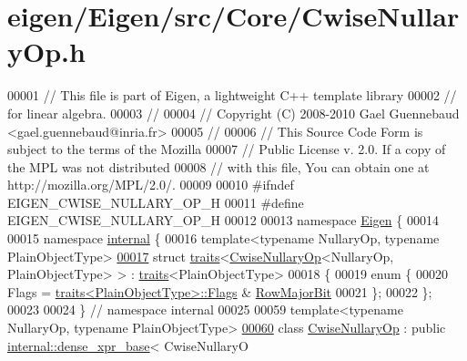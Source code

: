 \hypertarget{eigen_2_eigen_2src_2_core_2_cwise_nullary_op_8h_source}{}\section{eigen/\+Eigen/src/\+Core/\+Cwise\+Nullary\+Op.h}
\label{eigen_2_eigen_2src_2_core_2_cwise_nullary_op_8h_source}

\begin{DoxyCode}
00001 \textcolor{comment}{// This file is part of Eigen, a lightweight C++ template library}
00002 \textcolor{comment}{// for linear algebra.}
00003 \textcolor{comment}{//}
00004 \textcolor{comment}{// Copyright (C) 2008-2010 Gael Guennebaud <gael.guennebaud@inria.fr>}
00005 \textcolor{comment}{//}
00006 \textcolor{comment}{// This Source Code Form is subject to the terms of the Mozilla}
00007 \textcolor{comment}{// Public License v. 2.0. If a copy of the MPL was not distributed}
00008 \textcolor{comment}{// with this file, You can obtain one at http://mozilla.org/MPL/2.0/.}
00009 
00010 \textcolor{preprocessor}{#ifndef EIGEN\_CWISE\_NULLARY\_OP\_H}
00011 \textcolor{preprocessor}{#define EIGEN\_CWISE\_NULLARY\_OP\_H}
00012 
00013 \textcolor{keyword}{namespace }\hyperlink{namespace_eigen}{Eigen} \{
00014 
00015 \textcolor{keyword}{namespace }\hyperlink{namespaceinternal}{internal} \{
00016 \textcolor{keyword}{template}<\textcolor{keyword}{typename} NullaryOp, \textcolor{keyword}{typename} PlainObjectType>
\hyperlink{struct_eigen_1_1internal_1_1traits_3_01_cwise_nullary_op_3_01_nullary_op_00_01_plain_object_type_01_4_01_4}{00017} \textcolor{keyword}{struct }\hyperlink{struct_eigen_1_1internal_1_1traits}{traits}<\hyperlink{group___core___module_class_eigen_1_1_cwise_nullary_op}{CwiseNullaryOp}<NullaryOp, PlainObjectType> > : 
      \hyperlink{struct_eigen_1_1internal_1_1traits}{traits}<PlainObjectType>
00018 \{
00019   \textcolor{keyword}{enum} \{
00020     Flags = \hyperlink{struct_eigen_1_1internal_1_1traits}{traits<PlainObjectType>::Flags} & 
      \hyperlink{group__flags_gae4f56c2a60bbe4bd2e44c5b19cbe8762}{RowMajorBit}
00021   \};
00022 \};
00023 
00024 \} \textcolor{comment}{// namespace internal}
00025 
00059 \textcolor{keyword}{template}<\textcolor{keyword}{typename} NullaryOp, \textcolor{keyword}{typename} PlainObjectType>
\hyperlink{group___core___module}{00060} \textcolor{keyword}{class }\hyperlink{group___core___module_class_eigen_1_1_cwise_nullary_op}{CwiseNullaryOp} : \textcolor{keyword}{public} \hyperlink{struct_eigen_1_1internal_1_1dense__xpr__base}{internal::dense\_xpr\_base}< CwiseNullaryO

\end{DoxyCode}
